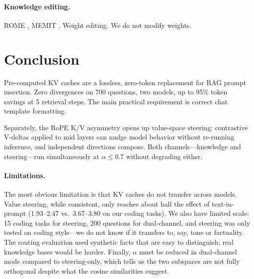 \documentclass{article}
\begin{document}
\paragraph{Knowledge editing.} ROME \citep{meng2022rome}, MEMIT \citep{meng2023memit}. Weight editing. We do not modify weights.

\section{Conclusion}

Pre-computed KV caches are a lossless, zero-token replacement for RAG prompt insertion. Zero divergences on 700 questions, two models, up to 95\% token savings at 5 retrieval steps. The main practical requirement is correct chat template formatting.

Separately, the RoPE K/V asymmetry opens up value-space steering: contrastive V-deltas applied to mid layers can nudge model behavior without re-running inference, and independent directions compose. Both channels---knowledge and steering---run simultaneously at $\alpha{\leq}0.7$ without degrading either.

\paragraph{Limitations.} The most obvious limitation is that KV caches do not transfer across models. Value steering, while consistent, only reaches about half the effect of text-in-prompt (1.93--2.47 vs.\ 3.67--3.80 on our coding tasks). We also have limited scale: 15 coding tasks for steering, 200 questions for dual-channel, and steering was only tested on coding style---we do not know if it transfers to, say, tone or factuality. The routing evaluation used synthetic facts that are easy to distinguish; real knowledge bases would be harder. Finally, $\alpha$ must be reduced in dual-channel mode compared to steering-only, which tells us the two subspaces are not fully orthogonal despite what the cosine similarities suggest.





\appendix
\end{document}

